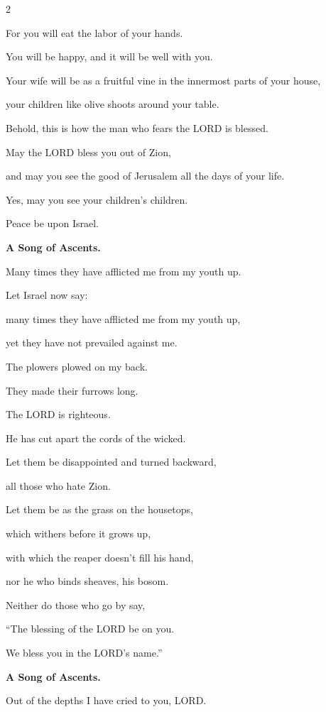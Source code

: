 \begin{multicols}{2}
	
	\myverse{}For you will eat the labor of your hands.
	
	You will be happy, and it will be well with you.
	
	
	\myverse{}Your wife will be as a fruitful vine in the innermost parts
	of your house,
	
	your children like olive shoots around your table.
	
	
	\myverse{}Behold, this is how the man who fears the LORD is blessed.
	
	
	\myverse{}May the LORD bless you out of Zion,
	
	and may you see the good of Jerusalem all the days of your life.
	
	
	\myverse{}Yes, may you see your children’s children.
	
	Peace be upon Israel.
	
	
	\mychapter{}\textbf{A Song of Ascents.}
	
	\quad\quad\quad \myverse*{}Many times they have afflicted me from my youth up.
	
	Let Israel now say:
	
	
	\myverse{}many times they have afflicted me from my youth up,
	
	yet they have not prevailed against me.
	
	
	\myverse{}The plowers plowed on my back.
	
	They made their furrows long.
	
	
	\myverse{}The LORD is righteous.
	
	He has cut apart the cords of the wicked.
	
	
	\myverse{}Let them be disappointed and turned backward,
	
	all those who hate Zion.
	
	
	\myverse{}Let them be as the grass on the housetops,
	
	which withers before it grows up,
	
	
	\myverse{}with which the reaper doesn’t fill his hand,
	
	nor he who binds sheaves, his bosom.
	
	
	\myverse{}Neither do those who go by say,
	
	“The blessing of the LORD be on you.
	
	We bless you in the LORD’s name.”
	
	
	\mychapter{}\textbf{A Song of Ascents.}
	
	\quad\quad\quad \myverse*{}Out of the depths I have cried to you, LORD.
	

\end{multicols}
